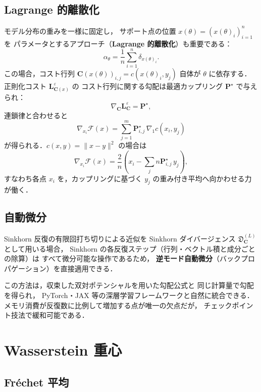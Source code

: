 \subsection{Lagrange 的離散化}\label{subsec:lagrangian}

モデル分布の重みを一様に固定し，
サポート点の位置 $x(\theta) = (x(\theta)_i)_{i=1}^n$ を
パラメータとするアプローチ（\textbf{Lagrange 的離散化}）も重要である：
\[
  \alpha_\theta = \frac{1}{n}\sum_{i=1}^n \delta_{x(\theta)_i}.
\]
この場合，コスト行列 $\mathbf{C}(x(\theta))_{i,j} = c(x(\theta)_i, y_j)$
自体が $\theta$ に依存する．
正則化コスト $\mathbf{L}^\varepsilon_{\mathbf{C}(x)}$ の
コスト行列に関する勾配は最適カップリング $\mathbf{P}^\star$ で与えられ：
\[
  \nabla_{\mathbf{C}} \mathbf{L}^\varepsilon_{\mathbf{C}} = \mathbf{P}^\star,
\]
連鎖律と合わせると
\[
  \nabla_{x_i} \mathcal{F}(x)
  = \sum_{j=1}^m \mathbf{P}^\star_{i,j}\, \nabla_1 c(x_i, y_j)
\]
が得られる．$c(x,y) = \|x - y\|^2$ の場合は
\[
  \nabla_{x_i} \mathcal{F}(x)
  = \frac{2}{n}\left(x_i - \sum_j n \mathbf{P}^\star_{i,j}\, y_j\right),
\]
すなわち各点 $x_i$ を，カップリングに基づく
$y_j$ の重み付き平均へ向かわせる力が働く．

\subsection{自動微分}\label{subsec:autodiff}

Sinkhorn 反復の有限回打ち切りによる近似を
Sinkhorn ダイバージェンス $\mathfrak{D}^{(L)}_{\mathbf{C}}$
として用いる場合，
Sinkhorn の各反復ステップ（行列・ベクトル積と成分ごとの除算）は
すべて微分可能な操作であるため，
\textbf{逆モード自動微分}（バックプロパゲーション）を直接適用できる．

この方法は，収束した双対ポテンシャルを用いた勾配公式と
同じ計算量で勾配を得られ，
PyTorch・JAX 等の深層学習フレームワークと自然に統合できる．
メモリ消費が反復数に比例して増加する点が唯一の欠点だが，
チェックポイント技法で緩和可能である．


\section{Wasserstein 重心}\label{sec:barycenter}

\subsection{Fr\'echet 平均}\label{subsec:frechet}

